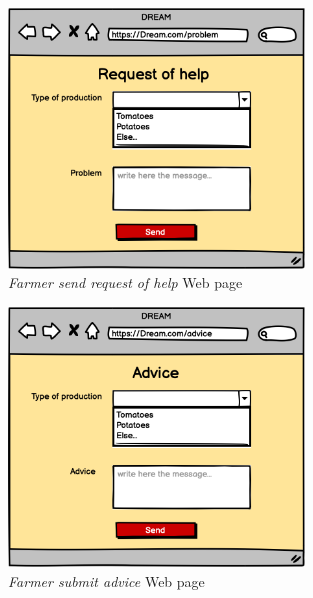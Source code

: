 \begin{figure}[H]
    \begin{center}
    \includegraphics[width=0.7\textwidth]{mocups/Help.png}
    \caption{\emph{Farmer send request of help} Web page}
    \label{fig:sequence1}
    \end{center}
\end{figure}

\begin{figure}[H]
    \begin{center}
    \includegraphics[width=0.7\textwidth]{mocups/Advice.png}
    \caption{\emph{Farmer submit advice} Web page}
    \label{fig:sequence1}
    \end{center}
\end{figure}

